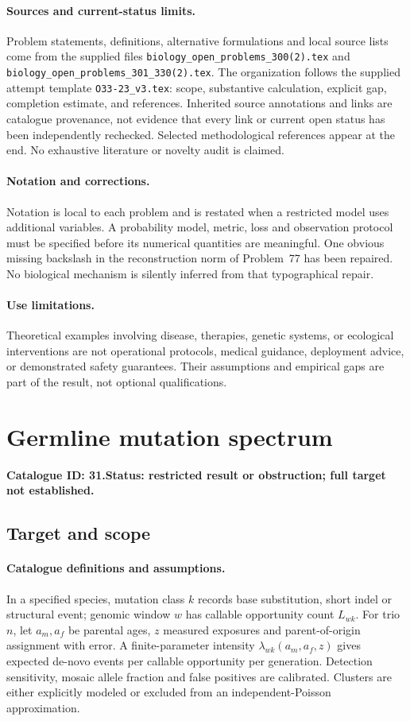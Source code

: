 \documentclass[11pt]{article}
\begin{document}
\paragraph{Sources and current-status limits.}
Problem statements, definitions, alternative formulations and local source lists
come from the supplied files
\texttt{biology\_open\_problems\_300(2).tex} and
\texttt{biology\_open\_problems\_301\_330(2).tex}.
The organization follows the supplied attempt template
\texttt{O33-23\_v3.tex}: scope, substantive calculation, explicit gap,
completion estimate, and references. Inherited source annotations and links are
catalogue provenance, not evidence that every link or current open status has
been independently rechecked. Selected methodological references appear at the
end. No exhaustive literature or novelty audit is claimed.

\paragraph{Notation and corrections.}
Notation is local to each problem and is restated when a restricted model uses
additional variables. A probability model, metric, loss and observation protocol
must be specified before its numerical quantities are meaningful. One obvious
missing backslash in the reconstruction norm of Problem~77 has been repaired.
No biological mechanism is silently inferred from that typographical repair.

\paragraph{Use limitations.}
Theoretical examples involving disease, therapies, genetic systems, or ecological
interventions are not operational protocols, medical guidance, deployment advice,
or demonstrated safety guarantees. Their assumptions and empirical gaps are part
of the result, not optional qualifications.

\setcounter{section}{30}
\section{Germline mutation spectrum}
\label{prob:031}
\noindent\textbf{Catalogue ID: 31.}\quad \textbf{Status: restricted result or obstruction; full target not established.}
\subsection{Target and scope}
\paragraph{Catalogue definitions and assumptions.}
In a specified species, mutation class $k$ records base substitution, short indel or structural event; genomic window $w$ has callable opportunity count $L_{wk}$. For trio $n$, let $a_m,a_f$ be parental ages, $z$ measured exposures and parent-of-origin assignment with error. A finite-parameter intensity $\lambda_{wk}(a_m,a_f,z)$ gives expected de-novo events per callable opportunity per generation. Detection sensitivity, mosaic allele fraction and false positives are calibrated. Clusters are either explicitly modeled or excluded from an independent-Poisson approximation.
\end{document}
